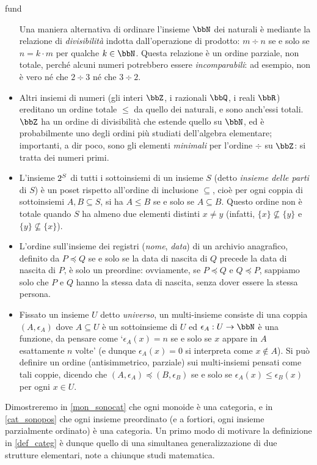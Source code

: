 \begin{hExamples}{fund}
\begin{itemize}
		      Una maniera alternativa di ordinare l'insieme \(\bbN\) dei naturali è mediante la relazione di \emph{divisibilità} indotta dall'operazione di prodotto: \(m\div n\) se e solo se \(n = k\cdot m\) per qualche \(k\in\bbN\). Questa relazione è un ordine parziale, non totale, perché alcuni numeri potrebbero essere \emph{incomparabili}: ad esempio, non è vero né che \(2\div 3\) né che \(3\div 2\).
		\item Altri insiemi di numeri (gli interi \(\bbZ\), i razionali \(\bbQ\), i reali \(\bbR\)) ereditano un ordine totale \(\le\)	da quello dei naturali, e sono anch'essi totali. \(\bbZ\) ha un ordine di divisibilità che estende quello su \(\bbN\), ed è probabilmente uno degli ordini più studiati dell'algebra elementare; importanti, a dir poco, sono gli elementi \emph{minimali} per l'ordine \(\div\) su \(\bbZ\): si tratta dei numeri primi.
		\item L'insieme \(2^{S}\) di tutti i sottoinsiemi di un insieme \(S\) (detto \emph{insieme  delle parti} di \(S\)) è un poset rispetto all'ordine di inclusione \(\subseteq\), cioè per ogni coppia di sottoinsiemi \(A,B\subseteq S\), si ha \(A\le B\) se e solo se \(A\subseteq B\). Questo ordine non è totale quando \(S\) ha almeno due elementi distinti \(x\ne y\) (infatti, \(\{x\}\not\subseteq\{y\}\) e \(\{y\}\not\subseteq\{x\}\)).
		\item L'ordine sull'insieme dei registri (\emph{nome}, \emph{data}) di un archivio anagrafico, definito da \(P\preceq Q\) se e solo se la data di nascita di \(Q\) precede la data di nascita di \(P\), è solo un preordine: ovviamente, se \(P\preceq Q\) e \(Q\preceq P\), sappiamo solo che \(P\) e \(Q\) hanno la stessa data di nascita, senza dover essere la stessa persona.
		\item Fissato un insieme \(U\) detto \emph{universo}, un multi-insieme consiste di una coppia \((A,\epsilon_A)\) dove \(A\subseteq U\) è un sottoinsieme di \(U\) ed \(\epsilon_A : U \to \bbN\) è una funzione, da pensare come `\(\epsilon_A(x)=n\) se e solo se \(x\) appare in \(A\) esattamente \(n\) volte' (e dunque \(\epsilon_A(x)=0\) si interpreta come \(x\notin A\)). Si può definire un ordine (antisimmetrico, parziale) sui multi-insiemi pensati come tali coppie, dicendo che \((A,\epsilon_A)\preceq (B,\epsilon_B)\) se e solo se \(\epsilon_A(x)\le \epsilon_B(x)\) per ogni \(x\in U\).
	\end{itemize}
\end{hExamples}
Dimostreremo in \ref{mon_sonocat} che ogni monoide è una categoria, e in \ref{cat_sonopos} che ogni insieme preordinato (e a fortiori, ogni insieme parzialmente ordinato) è una categoria. Un primo modo di motivare la definizione in \ref{def_categ} è dunque quello di una simultanea generalizzazione di due strutture elementari, note a chiunque studi matematica.


